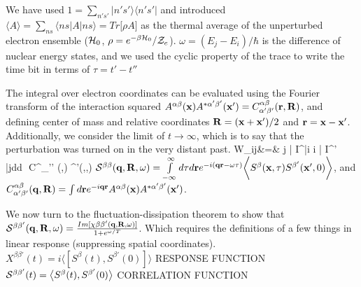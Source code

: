 \documentclass{article}
\begin{document}
\eea
We have used $1 = \sum\limits_{n's'} |n's'\rangle\langle n's'|$ and introduced $\bigg\langle A \bigg\rangle = \sum\limits_{ns}\langle ns|A|ns\rangle = Tr[\rho A  \big]$ as the thermal average of the unperturbed electron ensemble (${\cal H}_0$, $\rho = e^{-\beta {\cal H}_0}/{\cal Z}_e$). $\omega = (E_j-E_i)/\hbar$ is the difference of nuclear energy states, and we used the cyclic property of the trace to write the time bit in terms of $\tau = t'-t''$

The integral over electron coordinates can be evaluated using the Fourier transform of the interaction squared $A^{\alpha\beta}({\bf x})A^{*\alpha'\beta'}({\bf x}') = C^{\alpha\beta}_{\alpha'\beta' }({\bf r},{\bf R})$, and defining center of mass and relative coordinates ${\bf R}=({\bf x}+{\bf x}')/2$ and ${\bf r} = {\bf x} - {\bf x}'$. Additionally, we consider the limit of $t\rightarrow \infty$, which is to say that the perturbation was turned on in the very distant past.
\bea
W_{ij}&=& \langle j |  I^\alpha |i \rangle \langle i |  I^{\alpha'} |j\rangle\int d\vR d\vq  \,\, C^{\alpha\beta}_{\alpha'\beta' }(\vq,\vR) \cS^{\beta\beta'}(\vq,\vR,\omega) 
\eea
${\cal S}^{\beta\beta}({\bf q},{\bf R},\omega) = \int\limits_{-\infty}^{\infty} d\tau d{\bf r} e^{-i({\bf q}{\bf r}-\omega \tau)}\bigg\langle S^\beta({\bf x},\tau)S^{\beta'}({\bf x}',0) \bigg\rangle$, and  $C^{\alpha\beta}_{\alpha'\beta' }({\bf q},{\bf R})= \int d{\bf r} e^{-i{\bf q}{\bf r}}A^{\alpha\beta}({\bf x})A^{*\alpha'\beta' }({\bf x}')$.

We now turn to the fluctuation-dissipation theorem to show that ${\cal S}^{\beta\beta'}({\bf q},{\bf R},\omega) = \frac{Im[\chi{\beta\beta'}({\bf q},{\bf R},\omega)]}{1+e^{\omega/T}}$. Which requires the definitions of a few things in linear response (suppressing spatial coordinates).
\\ 

$X^{\beta\beta'}(t) = i\big\langle [S^\beta(t),S^{\beta'}(0)] \big\rangle$ RESPONSE FUNCTION\\

${\cal S}^{\beta\beta'}(t) = \big\langle S^\beta(t),S^{\beta'}(0) \big\rangle$ CORRELATION FUNCTION \\
\end{document}
